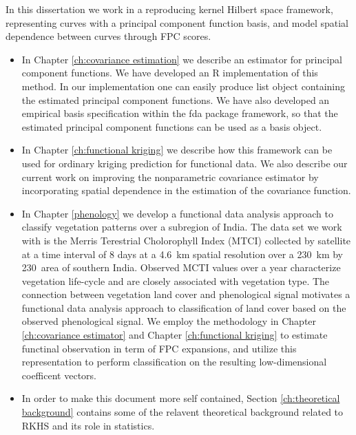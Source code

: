 In this dissertation we work in a reproducing kernel Hilbert space framework, representing curves with a principal component function basis, and model spatial dependence between curves through FPC scores.  
\begin{itemize}
\item In Chapter \ref{ch:covariance estimation} we describe an estimator for principal component functions. We have developed an R implementation of this method. In our implementation one can easily produce list object containing the estimated principal component functions. We have also developed an empirical basis specification  within the fda package framework, so that the estimated principal component functions can be used as a basis object.  %

\item In Chapter \ref{ch:functional kriging} we describe how this framework can be used for ordinary kriging prediction for functional data. We also describe our current work on improving the nonparametric covariance estimator by incorporating spatial dependence in the estimation of the covariance function. 

\item  In Chapter \ref{phenology} we develop a functional data analysis approach to classify vegetation patterns over a subregion of India. The data set we work with is the Merris Terestrial Cholorophyll Index (MTCI) collected by satellite at a time interval of 8 days at a 4.6~km spatial resolution over a 230~km by 230~area of southern India. Observed MCTI values over a year characterize vegetation life-cycle and are closely associated with vegetation type. The connection between vegetation land cover and phenological signal motivates a functional data analysis approach to classification of land cover based on the observed phenological signal. We employ the methodology in Chapter \ref{ch:covariance estimator} and Chapter \ref{ch:functional kriging} to estimate functinal observation in term of FPC expansions, and utilize this representation to perform classification on the resulting low-dimensional coefficent vectors. 

\item In order to make this document more self contained, Section \ref{ch:theoretical background} contains some of the relavent theoretical background related to RKHS and its role in statistics. 
\end{itemize}


